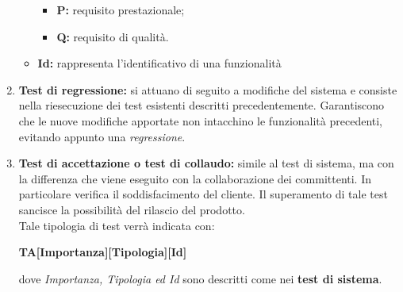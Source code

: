\begin{enumerate}
\begin{itemize}
\begin{itemize}
		\item \textbf{P:} requisito prestazionale;
		\item \textbf{Q:} requisito di qualità.
\end{itemize}
	\item \textbf{Id:} rappresenta l'identificativo di una funzionalità		 
\end{itemize}
	\item \textbf{Test di regressione:} si attuano di seguito a modifiche del sistema e consiste nella riesecuzione dei test esistenti descritti precedentemente. Garantiscono che le nuove modifiche apportate non intacchino le funzionalità precedenti, evitando appunto una \textit{regressione}.
	\item \textbf{Test di accettazione o test di collaudo:} simile al test di sistema, ma con la differenza che viene eseguito con la collaborazione dei committenti. In particolare verifica il soddisfacimento del cliente. Il superamento di tale test sancisce la possibilità del rilascio del prodotto.\\
	Tale tipologia di test verrà indicata con:
\begin{center}
	\textbf{TA[Importanza][Tipologia][Id]}
\end{center}
dove \textit{Importanza, Tipologia ed Id} sono descritti come nei \textbf{test di sistema}.

	
\end{enumerate}

